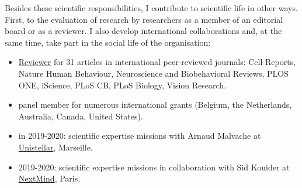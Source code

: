 \documentclass[10pt,english,a4paper,oneside]{article}%
\begin{document}
Besides these scientific responsibilities, I contribute to scientific life in other ways. First, to the evaluation of research by researchers as a member of an editorial board or as a reviewer. I also develop international collaborations and, at the same time, take part in the social life of the organisation:

\begin{itemize}
	\item \href{https://orcid.org/my-orcid?orcid=0000-0002-9536-010X}{Reviewer} for 31 articles in international peer-reviewed journals: Cell Reports, Nature Human Behaviour, Neuroscience and Biobehavioral Reviews, PLOS ONE, iScience, PLoS CB, PLoS Biology, Vision Research.

	\item panel member for numerous international grants (Belgium, the Netherlands, Australia, Canada, United States).

	\item in 2019-2020: scientific expertise missions with Arnaud Malvache at \href{https://unistellaroptics.com/}{Unistellar}, Marseille.

	\item 2019-2020: scientific expertise missions in collaboration with Sid Kouider at \href{https://www.next-mind.com/}{NextMind}, Paris.
\end{itemize}

\printbibliography
\end{document}
